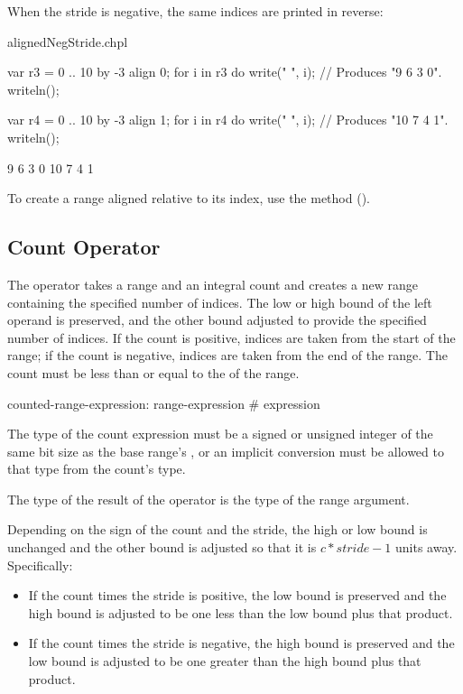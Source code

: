 When the stride is negative, the same indices are printed in reverse:
\begin{chapelexample}{alignedNegStride.chpl}
\begin{chapel}
var r3 = 0 .. 10 by -3 align 0;
for i in r3 do
  write(" ", i);			// Produces "9 6 3 0".
writeln();

var r4 = 0 .. 10 by -3 align 1;
for i in r4 do
  write(" ", i);			// Produces "10 7 4 1".
writeln();
\end{chapel}
\begin{chapeloutput}
 9 6 3 0
 10 7 4 1
\end{chapeloutput}
\end{chapelexample}

To create a range aligned relative to its  index, use
the  method ().


\subsection{Count Operator}
\label{Count_Operator}

The \chpl{\#} operator takes a range and an integral count and creates a new
range containing the specified number of indices.  The low or high bound of the
left operand is preserved, and the other bound adjusted to provide the specified
number of indices.  If the count is positive, indices are taken from the start
of the range; if the count is negative, indices are taken from the end of the
range.  The count must be less than or equal to the  of the range.

\begin{syntax}
counted-range-expression:
  range-expression # expression
\end{syntax}

The type of the count expression must be a signed or unsigned integer
of the same bit size as the base range's , or an
implicit conversion must be allowed to that type from the count's
type.

The type of the result of the \chpl{\#} operator is the type of the
range argument.

Depending on the sign of the count and the stride, the high or low bound is
unchanged and the other bound is adjusted so that it is $c * stride - 1$ units
away.  Specifically:
\begin{itemize}
\item If the count times the stride is positive, the low bound is preserved
and the high bound is adjusted to be one less than the low bound plus that
product.
\item If the count times the stride is negative, the high bound is preserved
and the low bound is adjusted to be one greater than the high bound plus that
product.
\end{itemize}

